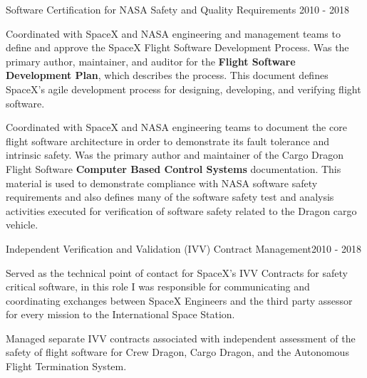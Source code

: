\begin{cventries}
  \cventry
  {Software Certification for NASA Safety and Quality Requirements}
  {}{}{2010 - 2018}
  {
    \begin{cvitems}
    \item Coordinated with SpaceX and NASA engineering and management teams to define and approve
      the SpaceX Flight Software Development Process. Was the primary author, maintainer, and
      auditor for the \textbf{Flight Software Development Plan}, which describes the process. This
      document defines SpaceX's agile development process for designing, developing, and verifying
      flight software.
    \item Coordinated with SpaceX and NASA engineering teams to document the core flight software
      architecture in order to demonstrate its fault tolerance and intrinsic safety. Was the primary
      author and maintainer of the Cargo Dragon Flight Software \textbf{Computer Based Control
      Systems} documentation. This material is used to demonstrate compliance with NASA software
      safety requirements and also defines many of the software safety test and analysis activities
      executed for verification of software safety related to the Dragon cargo vehicle.
    \end{cvitems}
  }


  \cventry
  {Independent Verification and Validation (IVV) Contract Management}{}{}{2010 - 2018}
  {
    \begin{cvitems}
    \item Served as the technical point of contact for SpaceX's IVV Contracts for safety critical
      software, in this role I was responsible for communicating and coordinating exchanges between
      SpaceX Engineers and the third party assessor for every mission to the International Space
      Station.
    \item Managed separate IVV contracts associated with independent assessment of the safety of
      flight software for Crew Dragon, Cargo Dragon, and the Autonomous Flight Termination System.
    \end{cvitems}
  }



\end{cventries}
